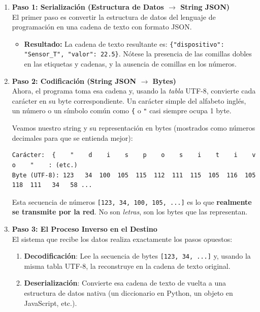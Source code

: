 \begin{enumerate}
    \item \textbf{Paso 1: Serialización (Estructura de Datos $\rightarrow$ String JSON)}\\
    El primer paso es convertir la estructura de datos del lenguaje de programación en una cadena de texto con formato JSON.
    \begin{itemize}
        \item \textbf{Resultado:} La cadena de texto resultante es: \lstinline|{"dispositivo": "Sensor_T", "valor": 22.5}|. Nótese la presencia de las comillas dobles en las etiquetas y cadenas, y la ausencia de comillas en los números.
    \end{itemize}

    \item \textbf{Paso 2: Codificación (String JSON $\rightarrow$ Bytes)}\\
    Ahora, el programa toma esa cadena y, usando la \textit{tabla} UTF-8, convierte cada carácter en su byte correspondiente. Un carácter simple del alfabeto inglés, un número o un símbolo común como \texttt{\{} o \texttt{"} casi siempre ocupa 1 byte.

    Veamos nuestro string y su representación en bytes (mostrados como números decimales para que se entienda mejor):
    \begin{lstlisting}[basicstyle=\ttfamily\small]
Carácter:  {    "    d    i    s    p    o    s    i    t    i    v    o    "    : (etc.)
Byte (UTF-8): 123   34  100  105  115  112  111  115  105  116  105  118  111   34   58 ...
    \end{lstlisting}
    
    Esta secuencia de números \lstinline|[123, 34, 100, 105, ...]| es lo que \textbf{realmente se transmite por la red}. No son \textit{letras}, son los bytes que las representan.

    \item \textbf{Paso 3: El Proceso Inverso en el Destino}\\
    El sistema que recibe los datos realiza exactamente los pasos opuestos:
    \begin{enumerate}[label*=\alph*.]
        \item \textbf{Decodificación}: Lee la secuencia de bytes \lstinline|[123, 34, ...]| y, usando la misma tabla UTF-8, la reconstruye en la cadena de texto original.
        \item \textbf{Deserialización}: Convierte esa cadena de texto de vuelta a una estructura de datos nativa (un diccionario en Python, un objeto en JavaScript, etc.).
    \end{enumerate}
\end{enumerate}

